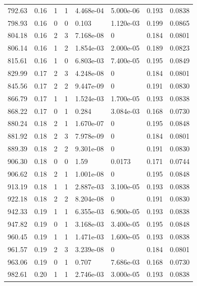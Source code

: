 \documentclass[preview]{standalone}
\begin{document}
{{{\begin{tabular}{L{1.2cm}C{1.2cm} C{0.3cm}C{0.5cm} C{1.4cm}C{1.4cm} C{1.4cm}C{1.4cm}}
  792.63  &  0.16  & 1     &  1 &  4.468e-04  & 5.000e-06  & 0.193 &  0.0838   \\ 
  798.93  &  0.16  & 0     &  0 &  0.103  & 1.120e-03  & 0.199 &  0.0865   \\ 
  804.18  &  0.16  & 2     &  3 &  7.168e-08  & 0  & 0.184 &  0.0801   \\ 
  806.14  &  0.16  & 1     &  2 &  1.854e-03  & 2.000e-05  & 0.189 &  0.0823   \\ 
  815.61  &  0.16  & 1     &  0 &  6.803e-03  & 7.400e-05  & 0.195 &  0.0849   \\ 
  829.99  &  0.17  & 2     &  3 &  4.248e-08  & 0  & 0.184 &  0.0801   \\ 
  845.56  &  0.17  & 2     &  2 &  9.447e-09  & 0  & 0.191 &  0.0830   \\ 
  866.79  &  0.17  & 1     &  1 &  1.524e-03  & 1.700e-05  & 0.193 &  0.0838   \\ 
  868.22  &  0.17  & 0     &  1 &  0.284  & 3.084e-03  & 0.168 &  0.0730   \\ 
  880.24  &  0.18  & 2     &  1 &  1.670e-07  & 0  & 0.195 &  0.0848   \\ 
  881.92  &  0.18  & 2     &  3 &  7.978e-09  & 0  & 0.184 &  0.0801   \\ 
  889.39  &  0.18  & 2     &  2 &  9.301e-08  & 0  & 0.191 &  0.0830   \\ 
  906.30  &  0.18  & 0     &  0 &  1.59  & 0.0173  & 0.171 &  0.0744   \\ 
  906.62  &  0.18  & 2     &  1 &  1.001e-08  & 0  & 0.195 &  0.0848   \\ 
  913.19  &  0.18  & 1     &  1 &  2.887e-03  & 3.100e-05  & 0.193 &  0.0838   \\ 
  922.18  &  0.18  & 2     &  2 &  8.204e-08  & 0  & 0.191 &  0.0830   \\ 
  942.33  &  0.19  & 1     &  1 &  6.355e-03  & 6.900e-05  & 0.193 &  0.0838   \\ 
  947.82  &  0.19  & 0     &  1 &  3.168e-03  & 3.400e-05  & 0.195 &  0.0848   \\ 
  960.45  &  0.19  & 1     &  1 &  1.471e-03  & 1.600e-05  & 0.193 &  0.0838   \\ 
  961.57  &  0.19  & 2     &  3 &  3.239e-08  & 0  & 0.184 &  0.0801   \\ 
  963.06  &  0.19  & 0     &  1 &  0.707  & 7.686e-03  & 0.168 &  0.0730   \\ 
  982.61  &  0.20  & 1     &  1 &  2.746e-03  & 3.000e-05  & 0.193 &  0.0838   \\ 

\end{tabular}}}}
\end{document}
